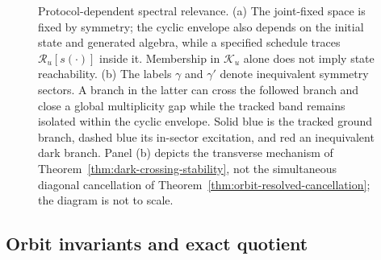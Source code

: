 \begin{figure}[t]
{
}
\caption{Protocol-dependent spectral relevance.  (a) The joint-fixed space
is fixed by symmetry; the cyclic envelope also depends on the initial state
and generated algebra, while a specified schedule traces
$\mathcal R_u[s(\cdot)]$ inside it.  Membership in $\mathcal K_u$ alone does
not imply state reachability.  (b) The labels $\gamma$ and $\gamma'$ denote
inequivalent symmetry sectors.  A branch in the latter can cross the followed
branch and close a global multiplicity gap while the tracked band remains
isolated within the cyclic envelope.  Solid blue is the tracked ground branch,
dashed blue its in-sector excitation, and red an inequivalent dark branch.
Panel (b) depicts the transverse mechanism of
Theorem~\ref{thm:dark-crossing-stability}, not the simultaneous diagonal
cancellation of Theorem~\ref{thm:orbit-resolved-cancellation}; the diagram
is not to scale.}
\label{fig:accessible-spectrum}
\end{figure}

\subsection{Orbit invariants and exact quotient}

